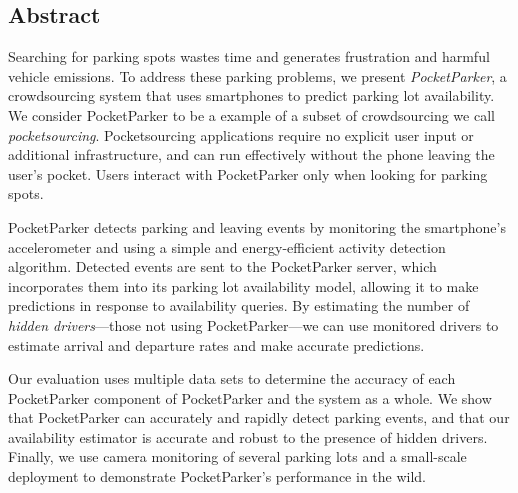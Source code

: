 \subsection*{Abstract}

Searching for parking spots wastes time and generates frustration and harmful
vehicle emissions. To address these parking problems, we present
\textit{PocketParker}, a crowdsourcing system that uses smartphones to
predict parking lot availability. We consider PocketParker to be a example of
a subset of crowdsourcing we call \textit{pocketsourcing}. Pocketsourcing
applications require no explicit user input or additional infrastructure, and
can run effectively without the phone leaving the user's pocket. Users
interact with PocketParker only when looking for parking spots.

PocketParker detects parking and leaving events by monitoring the
smartphone's accelerometer and using a simple and energy-efficient activity
detection algorithm. Detected events are sent to the PocketParker server,
which incorporates them into its parking lot availability model, allowing it
to make predictions in response to availability queries. By estimating the
number of \textit{hidden drivers}---those not using PocketParker---we can use
monitored drivers to estimate arrival and departure rates and make accurate
predictions.

Our evaluation uses multiple data sets to determine the accuracy of each
PocketParker component of PocketParker and the system as a whole. We show
that PocketParker can accurately and rapidly detect parking events, and that
our availability estimator is accurate and robust to the presence of hidden
drivers. Finally, we use camera monitoring of several parking lots and a
small-scale deployment to demonstrate PocketParker's performance in the wild.
